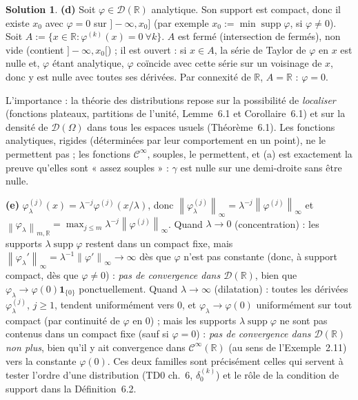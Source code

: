 \documentclass[11pt,a4paper]{article}
\newcommand{\R}{\mathbb{R}}
\newcommand{\norm}[1]{\left\|#1\right\|}
\newcommand{\Cinf}{\mathcal{C}^\infty}
\DeclareMathOperator{\supp}{supp}
\newcommand{\D}{\mathcal{D}}
\theoremstyle{definition}
\newtheorem*{solution}{Solution}
\begin{document}
\begin{solution}
\medskip
\noindent\textbf{(d)} Soit $\varphi\in\D(\R)$ analytique. Son support est compact, donc il existe $x_0$ avec $\varphi=0$ sur $]-\infty,x_0]$ (par exemple $x_0:=\min\supp\varphi$, si $\varphi\ne0$). Soit $A:=\{x\in\R:\varphi^{(k)}(x)=0\ \forall k\}$. $A$ est fermé (intersection de fermés), non vide (contient $]-\infty,x_0[$) ; il est ouvert : si $x\in A$, la série de Taylor de $\varphi$ en $x$ est nulle et, $\varphi$ étant analytique, $\varphi$ coïncide avec cette série sur un voisinage de $x$, donc y est nulle avec toutes ses dérivées. Par connexité de $\R$, $A=\R$ : $\varphi=0$.

L'importance : la théorie des distributions repose sur la possibilité de \emph{localiser} (fonctions plateaux, partitions de l'unité, Lemme~6.1 et Corollaire~6.1) et sur la densité de $\D(\Omega)$ dans tous les espaces usuels (Théorème~6.1). Les fonctions analytiques, rigides (déterminées par leur comportement en un point), ne le permettent pas ; les fonctions $\Cinf$, souples, le permettent, et (a) est exactement la preuve qu'elles sont « assez souples » : $\gamma$ est nulle sur une demi-droite sans être nulle.

\medskip
\noindent\textbf{(e)} $\varphi_\lambda^{(j)}(x)=\lambda^{-j}\varphi^{(j)}(x/\lambda)$, donc $\norm{\varphi_\lambda^{(j)}}_\infty=\lambda^{-j}\norm{\varphi^{(j)}}_\infty$ et $\norm{\varphi_\lambda}_{m,\R}=\max_{j\le m}\lambda^{-j}\norm{\varphi^{(j)}}_\infty$. Quand $\lambda\to0$ (concentration) : les supports $\lambda\supp\varphi$ restent dans un compact fixe, mais $\norm{\varphi_\lambda'}_\infty=\lambda^{-1}\norm{\varphi'}_\infty\to\infty$ dès que $\varphi$ n'est pas constante (donc, à support compact, dès que $\varphi\ne0$) : \emph{pas de convergence dans $\D(\R)$}, bien que $\varphi_\lambda\to\varphi(0)\mathbf 1_{\{0\}}$ ponctuellement. Quand $\lambda\to\infty$ (dilatation) : toutes les dérivées $\varphi_\lambda^{(j)}$, $j\ge1$, tendent uniformément vers $0$, et $\varphi_\lambda\to\varphi(0)$ uniformément sur tout compact (par continuité de $\varphi$ en $0$) ; mais les supports $\lambda\supp\varphi$ ne sont pas contenus dans un compact fixe (sauf si $\varphi=0$) : \emph{pas de convergence dans $\D(\R)$ non plus}, bien qu'il y ait convergence dans $\Cinf(\R)$ (au sens de l'Exemple~2.11) vers la constante $\varphi(0)$. Ces deux familles sont précisément celles qui servent à tester l'ordre d'une distribution (TD0 ch.~6, $\delta_0^{(k)}$) et le rôle de la condition de support dans la Définition~6.2.
\end{solution}
\end{document}
